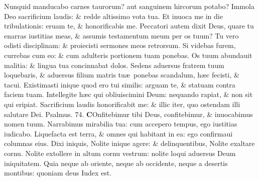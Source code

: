 \documentclass[a5paper,10pt]{book}
\def\ae{æ}
\begin{document}
\begin{multicols*}{2}
\newline \color{red} N\color{black}unquid manducabo carnes taurorum? aut sanguinem hircorum potabo?
\newline \color{red} I\color{black}mmola Deo sacrificium laudis: \& redde altissimo vota tua.
\newline \color{red} E\color{black}t inuoca me in die tribulationis: eruam te, \& honorificabis me.
\newline \color{red} P\color{black}eccatori autem dixit Deus, quare tu enarras iustitias meas, \& assumis testamentum meum per os tuum?
\newline \color{red} T\color{black}u vero odisti disciplinam: \& proiecisti sermones meos retrorsum.
\newline \color{red} S\color{black}i videbas furem, currebas cum eo: \& cum adulteris portionem tuam ponebas.
\newline \color{red} O\color{black}s tuum abundauit malitia: \& lingua tua concinnabat dolos.
\newline \color{red} S\color{black}edens aduersus fratrem tuum loquebaris, \& aduersus filium matris tu\ae \ ponebas scandalum, h\ae c fecisti, \& tacui.
\newline \color{red} E\color{black}xistimasti inique quod ero tui similis: arguam te, \& statuam contra faciem tuam.
\newline \color{red} I\color{black}ntellegite h\ae c qui obliuiscimini Deum: nequando rapiat, \& non sit qui eripiat.
\newline \color{red} S\color{black}acrificium laudis honorificabit me: \& illic iter, quo ostendam illi salutare Dei.
\newline \color{red} Psalmus. \hypertarget{ps74}{74.} \color{black}
\vspace{-.5em}
\lettrine[lines=2]{\bfseries \color{red} C}{}Onfitebimur tibi Deus, confitebimur, \& inuocabimus nomen tuum.
\newline \color{red} N\color{black}arrabimus mirabilia tua: cum accepero tempus, ego iustitias iudicabo.
\newline \color{red} L\color{black}iquefacta est terra, \& omnes qui habitant in ea: ego confirmaui columnas eius.
\newline \color{red} D\color{black}ixi iniquis, Nolite inique agere: \& delinquentibus, Nolite exaltare cornu.
\newline \color{red} N\color{black}olite extollere in altum cornu vestrum: nolite loqui aduersus Deum iniquitatem.
\newline \color{red} Q\color{black}uia neque ab oriente, neque ab occidente, neque a desertis montibus: quoniam deus Iudex est.

\end{multicols*}
\end{document}
